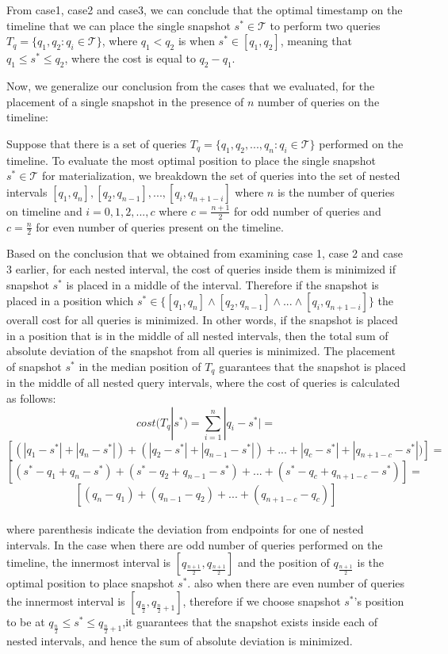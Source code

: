 			From case1, case2 and case3, we can conclude that the optimal timestamp on the timeline that we can place the single snapshot $s^* \in \mathcal{T}$ to perform two queries $T_q = \{q_1,q_2:q_i\in \mathcal{T}\}$, where $q_1<q_2$ is when $s^* \in [q_1,q_2]$, meaning that $q_1 \leq s^* \leq q_2$, where the cost is equal to $q_2-q_1$.

			Now, we generalize our conclusion from the cases that we evaluated, for the placement of a single snapshot in the presence of $n$ number of queries on the timeline: 

			Suppose that there is a set of queries $T_q=\{q_1,q_2,...,q_n:q_i \in \mathcal{T}\}$ performed on the timeline. To evaluate the most optimal position to place the single snapshot $s^* \in \mathcal{T}$ for materialization, we breakdown the set of queries into the set of nested intervals $[q_1,q_n],[q_2,q_{n-1}],...,[q_i,q_{n+1-i}]$ where $n$ is the number of queries on timeline and $i=0,1,2,...,c$ where $c=\frac{n+1}{2}$ for odd number of queries and $c=\frac{n}{2}$ for even number of queries present on the timeline.

			Based on the conclusion that we obtained from examining case 1, case 2 and case 3 earlier, for each nested interval, the cost of queries inside them is minimized if snapshot $s^*$ is placed in a middle of the interval. Therefore if the snapshot is placed in a position which $s^*\in \{ [q_1,q_n] \wedge [q_2,q_{n-1}] \wedge ... \wedge [q_i,q_{n+1-i}] \}$ the overall cost for all queries is minimized. In other words, if the snapshot is placed in a position that is in the middle of all nested intervals, then the total sum of absolute deviation of the snapshot from all queries is minimized. The placement of snapshot $s^*$ in the median position of $T_q$ guarantees that the snapshot is placed in the middle of all nested query intervals, where the cost of queries is calculated as follows:
			$$cost(T_q|s^*)=\sum_{i=1}^n |q_i-s^*| = $$
			$$[(|q_1-s^*|+|q_n-s^*|)+(|q_2-s^*|+|q_{n-1}-s^*|)+...+|q_c-s^*|+|q_{n+1-c}-s^*|)]=$$
			$$[(s^*-q_1+q_n-s^*)+(s^*-q_2+q_{n-1}-s^*)+...+(s^*-q_c+q_{n+1-c}-s^*)]=$$
			$$[(q_n-q_1)+(q_{n-1}-q_2)+...+(q_{n+1-c}-q_c)]$$\\
			where parenthesis indicate the deviation from endpoints for one of nested intervals. In the case when there are odd number of queries performed on the timeline, the innermost interval is $[q_{\frac{n+1}{2}},q_{\frac{n+1}{2}}]$ and the position of $q_{\frac{n+1}{2}}$ is the optimal position to place snapshot $s^*$. also when there are even number of queries the innermost interval is $[q_{\frac{n}{2}},q_{\frac{n}{2}+1}]$, therefore if we choose snapshot $s^*$'s position to be at $q_{\frac{n}{2}}\leq s^*\leq q_{\frac{n}{2}+1}$,it guarantees that the snapshot exists inside each of nested intervals, and hence the sum of absolute deviation is minimized. 


